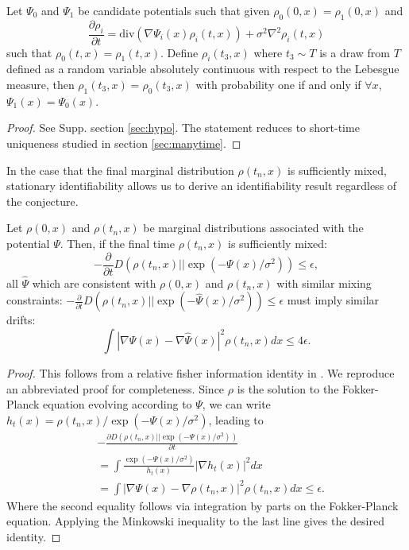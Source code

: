 \documentclass{article}
\begin{document}
\begin{cor}\label{cor:hypo}
Let $\Psi_0$ and $\Psi_1$ be candidate potentials such that given $\rho_0(0,x)=\rho_1(0,x)$ and
\[\frac{\partial \rho_i}{\partial t} = \text{div}(\nabla \Psi_i(x) \rho_i(t,x)) + \sigma^2\nabla^2 \rho_i(t,x)\]
such that $\rho_0(t,x) = \rho_1(t,x)$. Define $\rho_i(t_3,x)$ where $t_3 \sim T$ is a draw from $T$ defined as a random variable absolutely continuous with respect to the Lebesgue measure, then $\rho_1(t_3,x)=\rho_0(t_3,x)$ with probability one if and only if $\forall x$, $\Psi_1(x)=\Psi_0(x)$.
\end{cor}
\begin{proof}
See Supp. section \ref{sec:hypo}. The statement reduces to short-time uniqueness studied in section \ref{sec:manytime}.
\end{proof}

In the case that the final marginal distribution $\rho(t_n,x)$ is sufficiently mixed, stationary identifiability allows us to derive an identifiability result regardless of the conjecture.

\begin{thm}\label{thm:entropic}
Let $\rho(0,x)$ and $\rho(t_n,x)$ be marginal distributions associated with the potential $\Psi$. Then, if the final time $\rho(t_n,x)$ is sufficiently mixed:
\[-\frac{\partial }{\partial t}D(\rho(t_n,x)||\exp(-\Psi(x)/\sigma^2))\leq \epsilon,\]
all $\hat{\Psi}$ which are consistent with $\rho(0,x)$ and $\rho(t_n,x)$ with similar mixing constraints: $-\frac{\partial }{\partial t}D(\rho(t_n,x)||\exp(-\hat{\Psi}(x)/\sigma^2))\leq \epsilon$ must imply similar drifts:
\[\int |\nabla \Psi(x)-\nabla \hat{\Psi}(x)|^2\rho(t_n,x) dx \leq 4\epsilon.\]
\end{thm}
\begin{proof}
This follows from a relative fisher information identity in \citep[Lemma 4.1]{markowich2000trend}. We reproduce an abbreviated proof for completeness. Since $\rho$ is the solution to the Fokker-Planck equation evolving according to $\Psi$, we can write $h_t(x) = \rho(t_n,x)/\exp(-\Psi(x)/\sigma^2)$, leading to
\begin{align*}
&-\frac{\partial D(\rho(t_n,x)||\exp(-\Psi(x)/\sigma^2))}{\partial t}  \\
&= \int \frac{\exp(-\Psi(x)/\sigma^2)}{h_t(x)} |\nabla h_t(x)|^2 dx \\
&= \int |\nabla \Psi(x)-\nabla \rho(t_n,x)|^2\rho(t_n,x) dx \leq \epsilon.
\end{align*}
Where the second equality follows via integration by parts on the Fokker-Planck equation.
Applying the Minkowski inequality to the last line gives the desired identity.
\end{proof}
\end{document}
